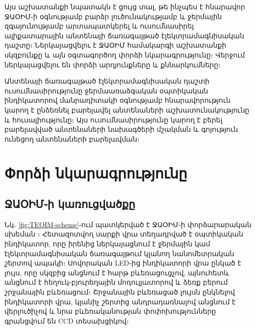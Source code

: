 \documentclass[12pt, fleqn]{report}
\begin{document}
Այս աշխատանքի նպատակն է ցույց տալ, թե ինչպես է հնարավոր ՋԱՕԻՄ֊ի օգնությամբ բարձր լուծունակությամբ և ջերմային զգայունությամբ արտապատկերել և ուսումնասիրել ալիքատարային անտենայի ճառագայթած էլեկտրամագնիսական դաշտը։ Ներկայացվելու է ՋԱՕԻՄ համակարգի աշխատանքի սկզբունքը և այն օգտագործող փորձի նկարագրությունը։ Վերջում ներկայացվելու են փորձի արդյունքները և քննարկումները։

Անտենայի ճառագայթած էլեկտրամագնիսական դաշտի ուսումնասիրությունը ջերմաառաձգական օպտիկական ինդիկատորով մանրադիտակի օգնությամբ հնարավորություն կարող է ընձեռնել բարելավել անտենաների աշխատունակությունը և հուսալիությունը։ Այս ուսումնասիրությունը կարող է բերել բարելավված անտենաների նախագծերի մշակման և գոյություն ունեցող անտենաների բարելավման։

\newpage

\renewcommand{\thesection}{\arabic{section}}

\section{Փորձի նկարագրությունը}
\subsection{ՋԱՕԻՄ֊ի կառուցվածքը}

Նկ․ \ref{fig:TEOIM-scheme}֊ում պատկերված է ՋԱՕԻՄ֊ի փորձարարական սխեման \cite{arakelyan2016teoim}։ Հետազոտվող սարքի վրա տեղադրված է օպտիկական ինդիկատոր, որը իրենից ներկայացնում է ջերմային կամ էլեկտրամագնիսական ճառագայթում կլանող նանոմետրական շերտով ապակի։ Սովորական LED֊ից ինդիկատորի վրա ընկած է լույս, որը սկզբից անցնում է հարթ բևեռացուցչով, այնուհետև անցնում է հեղուկ֊բյուրեղային մոդուլյատորով և ձեռք բերում շրջանային բևեռացում։ Շրջանային բևեռացած լույսն ընկնելով ինդիկատորի վրա, կլանիչ շերտից անդրադառնալով անցնում է վերլուծիչով և նրա բևեռականության փոփոխությունները գրանցվում են CCD տեսախցիկով։
\end{document}
